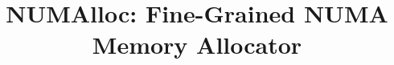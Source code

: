 \documentclass[acmsmall,anonymous,review]{acmart}
\begin{document}
\date{}

\title{NUMAlloc: Fine-Grained NUMA Memory Allocator}

\author{}

\begin{abstract}

\end{abstract}

\maketitle










\end{document}
